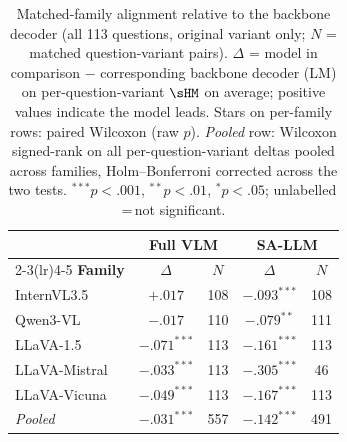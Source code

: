 \begin{table}[ht]
\centering\small\setlength{\tabcolsep}{5pt}
\begin{tabular}{l cc cc}
\toprule
& \multicolumn{2}{c}{\textbf{Full VLM}} & \multicolumn{2}{c}{\textbf{SA-LLM}} \\
\cmidrule(lr){2-3}\cmidrule(lr){4-5}
\textbf{Family} & $\Delta$ & $N$ & $\Delta$ & $N$ \\
\midrule
InternVL3.5 & $+.017$ & 108 & $-.093^{***}$ & 108 \\
Qwen3-VL & $-.017$ & 110 & $-.079^{**}$ & 111 \\
LLaVA-1.5 & $-.071^{***}$ & 113 & $-.161^{***}$ & 113 \\
LLaVA-Mistral & $-.033^{***}$ & 113 & $-.305^{***}$ & 46 \\
LLaVA-Vicuna & $-.049^{***}$ & 113 & $-.167^{***}$ & 113 \\
\midrule
\textit{Pooled} & $-.031^{***}$ & 557 & $-.142^{***}$ & 491 \\
\bottomrule
\end{tabular}
\caption{Matched-family alignment relative to the backbone decoder (all 113 questions, original variant only; $N$ = matched question-variant pairs).
$\Delta$ = model in comparison $-$ corresponding backbone decoder (LM) on per-question-variant $\sHM$ on average; positive values indicate the model leads.
Stars on per-family rows: paired Wilcoxon (raw $p$). \textit{Pooled} row: Wilcoxon signed-rank on all per-question-variant deltas pooled across families, Holm--Bonferroni corrected across the two tests. ${}^{***}p{<}.001$, ${}^{**}p{<}.01$, ${}^{*}p{<}.05$; unlabelled\,=\,not significant.}
\label{tab:matched_family_alignment_tests_orig}
\end{table}